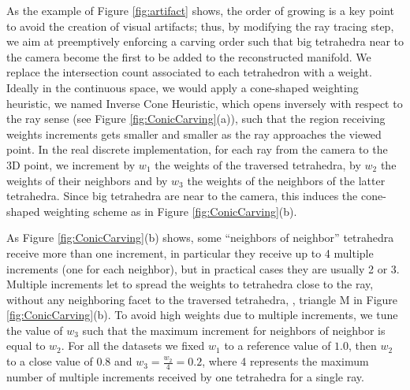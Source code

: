As the example of Figure \ref{fig:artifact} shows, the order of growing is a key point to avoid the creation of visual artifacts; thus,
 by modifying the ray tracing step, we aim at preemptively enforcing a carving order such that big tetrahedra near to the camera become the first to be added to the reconstructed manifold.
We replace the intersection count associated to each tetrahedron with a weight. Ideally in the continuous space, we would apply  a cone-shaped weighting heuristic, we named Inverse Cone Heuristic, which opens inversely with respect to the ray sense (see Figure \ref{fig:ConicCarving}(a)),  such that the region receiving weights increments gets smaller and smaller as the ray approaches the viewed point.
In the real discrete implementation, for each ray from the camera to the 3D point, we increment by $w_1$ the weights of the traversed tetrahedra, by $w_2$ the weights of their neighbors and by $w_3$ the weights of the neighbors of the latter tetrahedra.
Since big tetrahedra are near to the camera, this induces the cone-shaped weighting scheme as in Figure \ref{fig:ConicCarving}(b).

As Figure \ref{fig:ConicCarving}(b) shows, some ``neighbors of neighbor'' tetrahedra receive more than one increment, in particular they receive up to 4 multiple increments (one for each neighbor), but in practical cases they are usually 2 or 3.
Multiple increments let to spread the weights to tetrahedra close to the ray, without any  neighboring facet to the traversed tetrahedra, \eg,  triangle M in Figure \ref{fig:ConicCarving}(b).
To avoid high weights due to multiple increments, we tune the value of $w_3$ such that the maximum increment for neighbors of neighbor is equal to $w_2$.
For all the datasets we fixed $w_1$ to a reference value of $1.0$, then $w_2$ to a close value of $0.8$ and $w_3 = \frac{w_2}{4} = 0.2$, where 4 represents the maximum number of multiple increments received by one tetrahedra for a single ray. 


